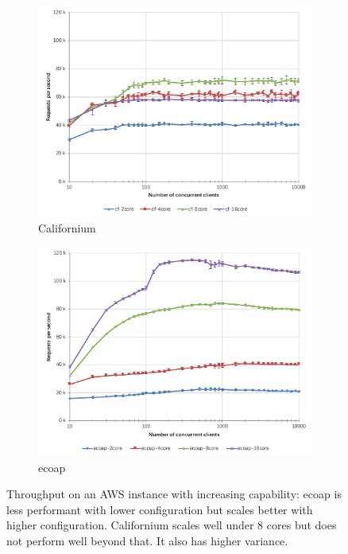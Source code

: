 \begin{figure}[!htbp]
\centering
\begin{subfigure}{0.75\textwidth}
\includegraphics[width=\linewidth]{cf_vertical_throughput}
\caption{Californium}
\end{subfigure}
\begin{subfigure}{0.75\textwidth}
\includegraphics[width=\linewidth]{ecoap_vertical_throughput}
\caption{ecoap}
\end{subfigure}
\caption[Throughput on an AWS instance with an increasing capability]{Throughput on an AWS instance with increasing capability: ecoap is less performant with lower configuration but scales better with higher configuration. Californium scales well under 8 cores but does not perform well beyond that. It also has higher variance.}
\label{fig:vertical_throughput}
\end{figure}


